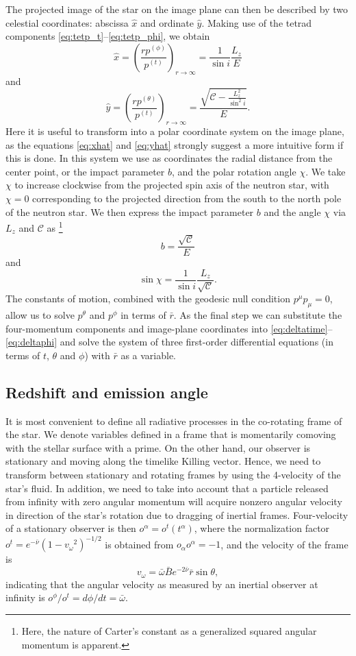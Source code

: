 \documentclass[iop, usenatbib]{emulateapj}
\newcommand{\be}{\begin{equation}}
\newcommand{\ee}{\end{equation}}
\newcommand{\Ca}{\ensuremath{\mathcal{C}}}
\newcommand{\rb}{\ensuremath{\bar{r}}}
\newcommand{\wb}{\ensuremath{\bar{\omega}}}
\newcommand{\nub}{\ensuremath{\bar{\nu}}}
\newcommand{\Bb}{\ensuremath{\bar{B}}}
\newcommand{\vw}{\ensuremath{v_{\omega}}}
\begin{document}
The projected image of the star on the image plane can then be described by two celestial coordinates:
abscissa $\hat{x}$ and ordinate $\hat{y}$.
Making use of the tetrad components \eqref{eq:tetp_t}--\eqref{eq:tetp_phi}, we obtain \citep[][p.347]{cha}
\be\label{eq:xhat}
\hat{x} = \left( \frac{rp^{(\phi)}}{p^{(t)}} \right)_{r \rightarrow \infty} = \frac{1}{\sin i} \frac{L_z}{E}
\ee
and
\be\label{eq:yhat}
\hat{y} = \left( \frac{rp^{(\theta)}}{p^{(t)}} \right)_{r \rightarrow \infty} = \frac{\sqrt{\Ca - \frac{L_z^2}{\sin^2 i}}}{E}.
\ee
Here it is useful to transform into a polar coordinate system on the image plane, as the equations \eqref{eq:xhat} and \eqref{eq:yhat} strongly suggest a more intuitive form if this is done. 
In this system we use as coordinates the radial distance from the center point, or the impact parameter $b$, and the polar rotation angle $\chi$.  
We take $\chi$ to increase clockwise from the projected spin axis of the neutron star, with $\chi=0$ corresponding to the projected direction from the south to the north pole of the neutron star.  
We then express the impact parameter $b$ and the angle $\chi$ via $L_z$ and $\Ca$ as%
\footnote{
    Here, the nature of Carter's constant as a generalized squared
    angular momentum is apparent.
}
\be
b = \frac{\sqrt{\Ca}}{E}
\ee
and
\be
\sin \chi = \frac{1}{\sin i} \frac{L_z}{\sqrt{\Ca}}.
\ee
The constants of motion, combined with the geodesic null condition $p^\mu p_\mu = 0$, allow us to solve $p^\theta$ and $p^\phi$ in terms of $\rb$.
As the final step we can substitute the four-momentum components and image-plane coordinates into \eqref{eq:deltatime}--\eqref{eq:deltaphi} and solve the system of three first-order differential equations (in terms of $t$, $\theta$ and $\phi$) with $\rb$ as a variable.


\subsection{Redshift and emission angle}\label{sect:redshift_angle}
It is most convenient to define all radiative processes in the co-rotating frame of the star.
We denote variables defined in a frame that is momentarily comoving with the stellar surface with a prime.  
On the other hand, our observer is stationary and moving along the timelike Killing vector.  
Hence, we need to transform between stationary and rotating frames by using the 4-velocity of the star's fluid.  
In addition, we need to take into account that a particle released from infinity with zero angular momentum will acquire nonzero angular velocity in direction of the star's rotation due to dragging of inertial frames.
Four-velocity of a stationary observer is then $o^{\alpha} = o^t(t^{\alpha})$, where the normalization factor $o^t = e^{-\nub}(1-\vw^2)^{-1/2}$ is obtained from $o_{\alpha}o^{\alpha} = -1$, and the velocity of the frame is 
\be
\vw = \wb \Bb e^{-2\nub} \rb \sin\theta,
\ee
indicating that the angular velocity as measured by an inertial observer at infinity is $o^{\phi} / o^{t} = d\phi/dt = \wb$.
\end{document}
